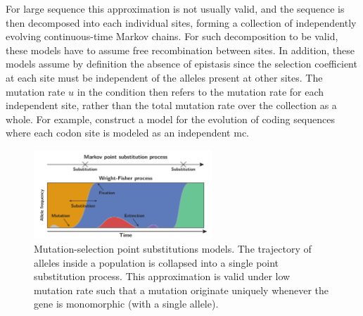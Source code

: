 For large sequence this approximation is not usually valid, and the sequence is then decomposed into each individual sites, forming a collection of independently evolving continuous-time Markov chains.
For such decomposition to be valid, these models have to assume free \gls{recombination} between sites.
In addition, these models assume by definition the absence of epistasis since the selection coefficient at each site must be independent of the alleles present at other sites. 
The mutation rate $u$ in the condition then refers to the mutation rate for each independent site, rather than the total mutation rate over the collection as a whole.
For example, \citet{Halpern1998} construct a model for the evolution of coding sequences where each \gls{codon} site is modeled as an independent \gls{mc}. 

\begin{figure}[thbp]
	\centering
	\includegraphics[width=0.6\textwidth]{figures/point-process.pdf}
	\caption[Mutation-selection point substitutions]{Mutation-selection point substitutions models. The trajectory of alleles inside a population is collapsed into a single point \gls{substitution} process. This approximation is valid under low mutation rate such that a mutation originate uniquely whenever the gene is monomorphic (with a single allele).}
\end{figure}


